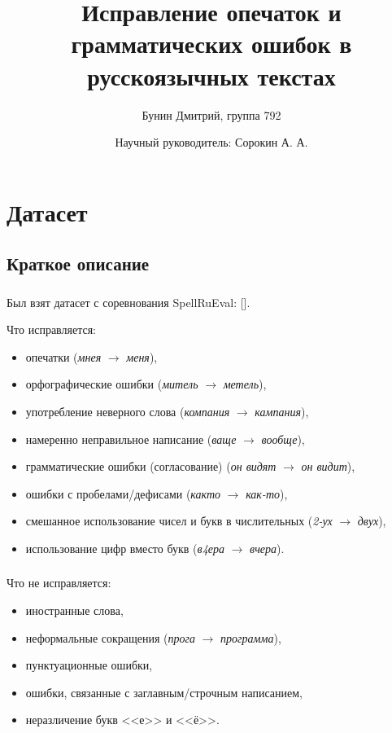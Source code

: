 \documentclass[t]{beamer}  %
\title{Исправление опечаток и грамматических ошибок в русскоязычных текстах}
\author{Бунин Дмитрий, группа 792}
\date{Научный руководитель: Сорокин А. А.}
\begin{document}
\frame[plain]{\titlepage}	%

\section{Датасет}

\subsection{Краткое описание}
 \begin{frame}
	\frametitle{\insertsection}
	Был взят датасет с соревнования SpellRuEval: [\textcite{Sorokin2016a}].
	
	Что исправляется:
	\begin{itemize}
		\item опечатки (\textit{мнея} $\rightarrow$ \textit{меня}),
		\item орфографические ошибки (\textit{митель} $\rightarrow$ \textit{метель}),
		\item употребление неверного слова (\textit{компания} $\rightarrow$ \textit{кампания}),
		\item намеренно неправильное написание (\textit{ваще} $\rightarrow$ \textit{вообще}),
		\item грамматические ошибки (согласование) (\textit{он видят} $\rightarrow$ \textit{он видит}),
		\item ошибки с пробелами/дефисами (\textit{както} $\rightarrow$ \textit{как-то}),
		\item смешанное использование чисел и букв в числительных (\textit{2-ух} $\rightarrow$ \textit{двух}),
		\item использование цифр вместо букв (\textit{в4ера} $\rightarrow$ \textit{вчера}).
	\end{itemize}
\end{frame}

 \begin{frame}
	\frametitle{\insertsection}
	Что не исправляется:
	\begin{itemize}
		\item иностранные слова,
		\item неформальные сокращения (\textit{прога} $\rightarrow$ \textit{программа}),
		\item пунктуационные ошибки,
		\item ошибки, связанные с заглавным/строчным написанием,
		\item неразличение букв <<е>> и <<ё>>.
	\end{itemize}
\end{frame}
\end{document}
